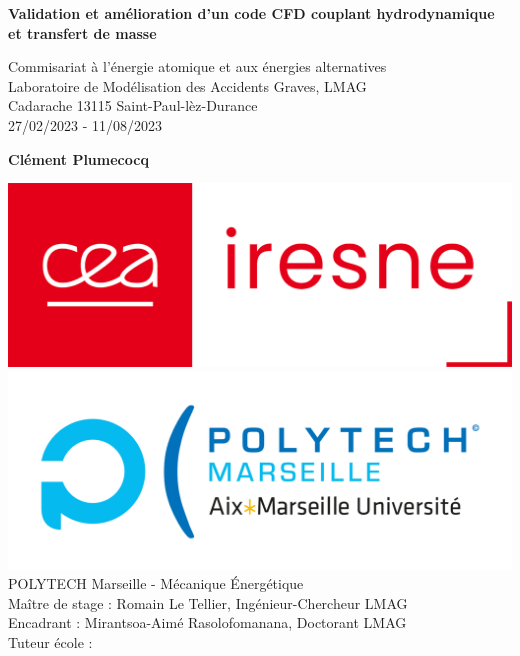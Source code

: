 \documentclass[a4paper,11pt,fleqn]{report}    %
\begin{document}

\hypersetup{pageanchor=false}
\begin{titlepage}
    \begin{center}
        \vspace*{1cm}

        \Huge
        \textbf{Validation et amélioration d'un code CFD couplant hydrodynamique et transfert de masse}

        \vspace{0.5cm}
        \LARGE
        Commisariat à l'énergie atomique et aux énergies alternatives \\
        Laboratoire de Modélisation des Accidents Graves, LMAG\\
        \Large Cadarache 13115 Saint-Paul-lèz-Durance\\
         27/02/2023 - 11/08/2023
        \vspace{1.5cm}

        \textbf{\LARGE Clément Plumecocq}

        \vfill

        \includegraphics[scale=0.15]{logo_iresne.png}\includegraphics[scale=0.20]{polytech.jpg}
        \vfill
        \Large
        \noindent%
        POLYTECH Marseille - Mécanique Énergétique \\ \vfill
        Maître de stage : Romain Le Tellier, Ingénieur-Chercheur LMAG \\
        Encadrant : Mirantsoa-Aimé Rasolofomanana, Doctorant LMAG \\
        Tuteur école : 
    \end{center}
\end{titlepage}
\end{document}
